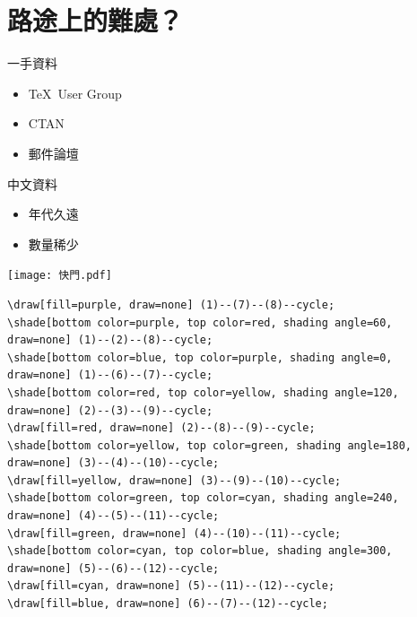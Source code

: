 \section{路途上的難處？}
\newpage
\begin{tcolorbox}
一手資料
\end{tcolorbox}
\begin{LARGE}
\begin{itemize}
\item \TeX\ User Group
\item CTAN
\item 郵件論壇
\end{itemize}
\end{LARGE}
\newpage
\begin{tcolorbox}
中文資料
\end{tcolorbox}
\begin{LARGE}
\begin{itemize}
\item 年代久遠
\item 數量稀少
\end{itemize}
\end{LARGE}
\newpage
\begin{center}
\begin{figboxs}
\centering
\texttt{[image: 快門.pdf]}
\end{figboxs}
\end{center}
\newpage
\begin{center}
\begin{figboxs}
\begin{footnotesize}
\begin{verbatim}
\draw[fill=purple, draw=none] (1)--(7)--(8)--cycle;
\shade[bottom color=purple, top color=red, shading angle=60, draw=none] (1)--(2)--(8)--cycle;
\shade[bottom color=blue, top color=purple, shading angle=0, draw=none] (1)--(6)--(7)--cycle;
\shade[bottom color=red, top color=yellow, shading angle=120, draw=none] (2)--(3)--(9)--cycle;
\draw[fill=red, draw=none] (2)--(8)--(9)--cycle;
\shade[bottom color=yellow, top color=green, shading angle=180, draw=none] (3)--(4)--(10)--cycle;
\draw[fill=yellow, draw=none] (3)--(9)--(10)--cycle;
\shade[bottom color=green, top color=cyan, shading angle=240, draw=none] (4)--(5)--(11)--cycle;
\draw[fill=green, draw=none] (4)--(10)--(11)--cycle;
\shade[bottom color=cyan, top color=blue, shading angle=300, draw=none] (5)--(6)--(12)--cycle;
\draw[fill=cyan, draw=none] (5)--(11)--(12)--cycle;
\draw[fill=blue, draw=none] (6)--(7)--(12)--cycle;
\end{verbatim}
\end{footnotesize}
\end{figboxs}
\end{center}
